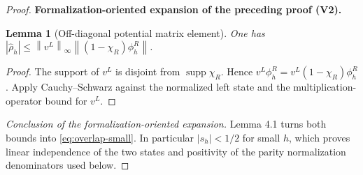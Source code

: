 \documentclass[11pt]{article}
\newtheorem{lemma}[theorem]{Lemma}
\newcommand{\formalisationparentid}{X}
\newenvironment{formalisationaddition}[1]{\par\medskip\begingroup\color{blue}\def\formalisationparentid{#1}\setcounter{formalizationsublemma}{0}\let\lemma\formalizationsublemma\let\endlemma\endformalizationsublemma
  \def\Eo{\mathcal E_h^\circ}\def\EE{\mathcal E_h}\def\phio{\phi_h^\circ}\def\phih{\phi_h}\def\Ho{H_h^{\rm atom}(v^\circ)}\def\Ha{H_h^{\rm atom}}\def\HL{H_h^{L}}\def\Dh{D_h}\def\Log{\operatorname{Log}}\def\ellh{\ell_h}\def\Gp{G_{p,h}}\def\Ast{A_{*,h}}\def\ahat{\widehat{\mathfrak a}_h}\def\ah{\mathfrak a_h}\def\rh{\widehat\rho_h}\def\deltah{\widehat\delta_h}\def\oldref##1{\textup{(##1)}}\def\interface##1{\par\noindent\textit{Analytical interface used here.} ##1\par}\def\finish{\par\noindent\textit{Conclusion of the formalization-oriented expansion.} }\par\noindent\textbf{Formalization-oriented expansion of the preceding proof (V2).}\par\smallskip
}{\par\endgroup\medskip
}
\newcommand{\norm}[1]{\left\|#1\right\|}
\newcommand{\supp}{\operatorname{supp}}
\begin{document}
\begin{proof}
\begin{formalisationaddition}{T4.3}
\begin{lemma}[Off-diagonal potential matrix element]\label{sublemma:T4-3-hopping-bound}
One has $|\rh|\le\norm{v^L}_\infty\norm{(1-\chi_R)\phi_h^R}$.
\end{lemma}
\begin{proof}
The support of $v^L$ is disjoint from $\supp\chi_R$. Hence $v^L\phi_h^R=v^L(1-\chi_R)\phi_h^R$. Apply Cauchy--Schwarz against the normalized left state and the multiplication-operator bound for $v^L$.
\end{proof}
\finish Lemma 4.1 turns both bounds into \eqref{eq:overlap-small}. In particular $|s_h|<1/2$ for small $h$, which proves linear independence of the two states and positivity of the parity normalization denominators used below.
\end{formalisationaddition}

\end{proof}
\end{document}
